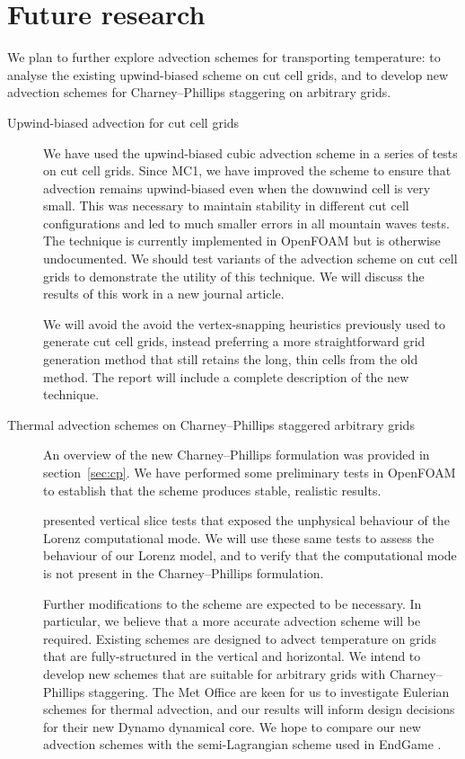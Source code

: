 \documentclass[a4paper]{article}
\begin{document}
\section{Future research}
We plan to further explore advection schemes for transporting temperature: to analyse the existing upwind-biased scheme on cut cell grids, and to develop new advection schemes for Charney--Phillips staggering on arbitrary grids.

\begin{description}
	\item[Upwind-biased advection for cut cell grids]{We have used the upwind-biased cubic advection scheme in a series of tests on cut cell grids.  Since MC1, we have improved the scheme to ensure that advection remains upwind-biased even when the downwind cell is very small.  This was necessary to maintain stability in different cut cell configurations and led to much smaller errors in all mountain waves tests.  The technique is currently implemented in OpenFOAM but is otherwise undocumented.  We should test variants of the advection scheme on cut cell grids to demonstrate the utility of this technique.  We will discuss the results of this work in a new journal article.
		
We will avoid the avoid the vertex-snapping heuristics previously used to generate cut cell grids, instead preferring a more straightforward grid generation method that still retains the long, thin cells from the old method.  The report will include a complete description of the new technique.}

\item[Thermal advection schemes on Charney--Phillips staggered arbitrary grids]{An overview of the new Charney--Phillips formulation was provided in section~\ref{sec:cp}.  We have performed some preliminary tests in OpenFOAM to establish that the scheme produces stable, realistic results.
		
\cite{arakawa-konor1996} presented vertical slice tests that exposed the unphysical behaviour of the Lorenz computational mode.  We will use these same tests to assess the behaviour of our Lorenz model, and to verify that the computational mode is not present in the Charney--Phillips formulation.
		
Further modifications to the scheme are expected to be necessary.  In particular, we believe that a more accurate advection scheme will be required.
Existing schemes are designed to advect temperature on grids that are fully-structured in the vertical and horizontal.  We intend to develop new schemes that are suitable for arbitrary grids with Charney--Phillips staggering.
The Met Office are keen for us to investigate Eulerian schemes for thermal advection, and our results will inform design decisions for their new Dynamo dynamical core.  We hope to compare our new advection schemes with the semi-Lagrangian scheme used in EndGame \citep{davies2005}.}
\end{description}
\end{document}
